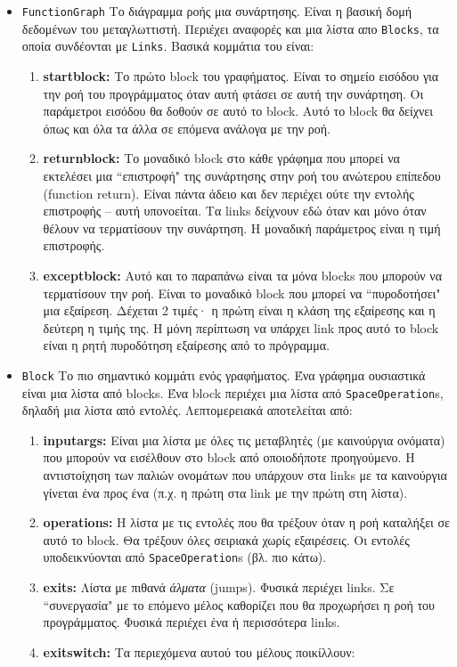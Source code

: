 \begin{itemize}

\item \texttt{FunctionGraph} Το διάγραμμα ροής μια συνάρτησης. Είναι η βασική
δομή δεδομένων του μεταγλωττιστή. Περιέχει αναφορές και μια λίστα απο
\texttt{Blocks}, τα οποία συνδέονται με \texttt{Links}. Βασικά κομμάτια του
είναι:

\begin{enumerate}
\item \textbf{startblock:} Το πρώτο block του γραφήματος. Είναι το σημείο
εισόδου για την ροή του προγράμματος όταν αυτή φτάσει σε αυτή την συνάρτηση. Οι
παράμετροι εισόδου θα δοθούν σε αυτό το block. Αυτό το block θα δείχνει όπως
και όλα τα άλλα σε επόμενα ανάλογα με την ροή.
\item \textbf{returnblock:} Το μοναδικό block στο κάθε γράφημα που μπορεί να
εκτελέσει μια ``επιστροφή" της συνάρτησης στην ροή του ανώτερου επίπεδου
(function return). Είναι πάντα άδειο και δεν περιέχει ούτε την εντολής
επιστροφής – αυτή υπονοείται. Τα links δείχνουν εδώ όταν και μόνο όταν θέλουν
να τερματίσουν την συνάρτηση. Η μοναδική παράμετρος είναι η τιμή επιστροφής.
\item \textbf{exceptblock:} Αυτό και το παραπάνω είναι τα μόνα blocks που
μπορούν να τερματίσουν την ροή. Είναι το μοναδικό block που μπορεί να
``πυροδοτήσει" μια εξαίρεση. Δέχεται 2 τιμές· η πρώτη είναι η κλάση της εξαίρεσης
και η δεύτερη η τιμής της. Η μόνη περίπτωση να υπάρχει link προς αυτό το block
είναι η ρητή πυροδότηση εξαίρεσης από το πρόγραμμα.
\end{enumerate}

\item \texttt{Block} Το πιο σημαντικό κομμάτι ενός γραφήματος. Ένα γράφημα
ουσιαστικά είναι μια λίστα από blocks. Ένα block περιέχει μια λίστα από
\texttt{SpaceOperation}s, δηλαδή μια λίστα από εντολές. Λεπτομερειακά
αποτελείται από:

\begin{enumerate}
\item \textbf{inputargs:} Είναι μια λίστα με όλες τις μεταβλητές (με καινούργια
ονόματα) που μπορούν να εισέλθουν στο block από οποιοδήποτε προηγούμενο. Η
αντιστοίχηση των παλιών ονομάτων που υπάρχουν στα links με τα καινούργια 
γίνεται ένα προς ένα (π.χ. η πρώτη στα link με την πρώτη στη λίστα).
\item \textbf{operations:} Η λίστα με τις εντολές που θα τρέξουν όταν η ροή
καταλήξει σε αυτό το block. Θα τρέξουν όλες σειριακά χωρίς εξαιρέσεις. Οι
εντολές υποδεικνύονται από \texttt{SpaceOperation}s (βλ. πιο κάτω).
\item \textbf{exits:} Λίστα με πιθανά \textit{άλματα} (jumps). Φυσικά περιέχει
links. Σε ``συνεργασία" με το επόμενο μέλος καθορίζει που θα προχωρήσει η ροή 
του προγράμματος. Φυσικά περιέχει ένα ή περισσότερα links.
\item \textbf{exitswitch:} Τα περιεχόμενα αυτού του μέλους ποικίλλουν:


\end{enumerate}
\end{itemize}
